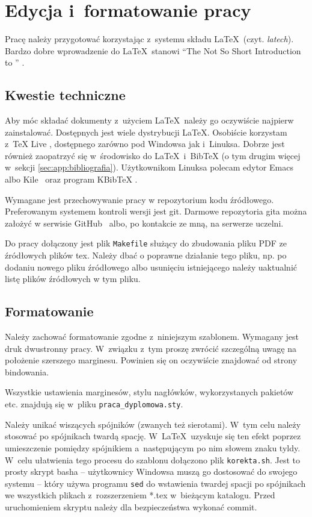 \chapter{Edycja i~formatowanie pracy}\label{app:edycja}

Pracę należy przygotować korzystając z~systemu składu \LaTeX~(czyt.
\textit{latech}).  Bardzo dobre wprowadzenie do \LaTeX~stanowi ``The Not So
Short Introduction to \LaTeXe'' \cite{Oet11}.

\section{Kwestie techniczne}
Aby móc składać dokumenty z~użyciem \LaTeX~należy go oczywiście najpierw
zainstalować.  Dostępnych jest wiele dystrybucji \LaTeX. Osobiście korzystam
z~TeX Live \cite{texlive}, dostępnego zarówno pod Windowsa jak i~Linuksa. Dobrze
jest również zaopatrzyć się w~środowisko do \LaTeX~i~BibTeX (o tym drugim więcej
w~sekcji \ref{sec:app:bibliografia}).  Użytkownikom Linuksa polecam edytor
Emacs~\cite{emacs} albo Kile~\cite{kile} oraz program KBibTeX \cite{kbibtex}.

Wymagane jest przechowywanie pracy w repozytorium kodu źródłowego.  Preferowanym
systemem kontroli wersji jest git.  Darmowe repozytoria gita można założyć w
serwisie GitHub~\cite{github} albo, po kontakcie ze mną, na serwerze uczelni.

Do pracy dołączony jest plik \texttt{Makefile} służący do zbudowania pliku PDF
ze źródłowych plików tex.  Należy dbać o poprawne działanie tego pliku, np. po
dodaniu nowego pliku źródłowego albo usunięciu istniejącego należy uaktualnić
listę plików źródłowych w tym pliku.

\section{Formatowanie}
Należy zachować formatowanie zgodne z~niniejszym szablonem. Wymagany jest druk
dwustronny pracy.  W~związku z~tym proszę zwrócić szczególną uwagę na położenie
szerszego marginesu. Powinien się on oczywiście znajdować od strony bindowania.

Wszystkie ustawienia marginesów, stylu nagłówków, wykorzystanych pakietów etc.
znajdują się w~pliku \texttt{praca\_dyplomowa.sty}.

Należy unikać wiszących spójników (zwanych też sierotami). W~tym celu należy
stosować po spójnikach twardą spację. W~\LaTeX~uzyskuje się ten efekt poprzez
umieszczenie pomiędzy spójnikiem a~następującym po nim słowem znaku tyldy.
W~celu ułatwienia tego procesu do szablonu dołączono plik
\texttt{korekta.sh}. Jest to prosty skrypt basha -- użytkownicy Windowsa muszą
go dostosować do swojego systemu -- który używa programu \texttt{sed} do
wstawienia twardej spacji po spójnikach we wszystkich plikach z~rozszerzeniem
*.tex w~bieżącym katalogu.  Przed uruchomieniem skryptu należy dla
bezpieczeństwa wykonać commit.

